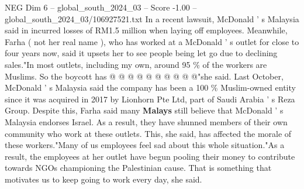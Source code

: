 \begin{textsample}{NEG Dim 6 – global\_south\_2024\_03 – Score -1.00 – global\_south\_2024\_03/106927521.txt}
In a recent lawsuit, McDonald ' s Malaysia said in incurred losses of RM1.5 million when laying off employees.
Meanwhile, Farha ( not her real name ), who has worked at a McDonald ' s outlet for close to four years now, said it upsets her to see people being let go due to declining sales."In most outlets, including my own, around 95 \% of the workers are Muslims.
So the boycott has @ @ @ @ @ @ @ @ @ @"she said.
Last October, McDonald ' s Malaysia said the company has been a 100 \% Muslim-owned entity since it was acquired in 2017 by Lionhorn Pte Ltd, part of Saudi Arabia ' s Reza Group.
Despite this, Farha said many \textbf{Malays} still believe that McDonald ' s Malaysia endorses Israel.
As a result, they have shunned members of their own community who work at these outlets.
This, she said, has affected the morale of these workers."Many of us employees feel sad about this whole situation."As a result, the employees at her outlet have begun pooling their money to contribute towards NGOs championing the Palestinian cause.
That is something that motivates us to keep going to work every day, she said.

\end{textsample}
